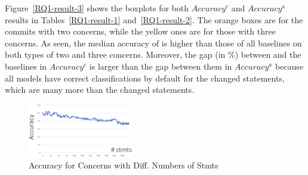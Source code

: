 
Figure~\ref{RQ1-result-3} shows the boxplots for both $Accuracy^c$ and
$Accuracy^a$ results in Tables~\ref{RQ1-result-1}
and~\ref{RQ1-result-2}. The orange boxes are for the commits with two
concerns, while the yellow ones are for those with three concerns. As
seen, the median accuracy of {\tool} is higher than those of all
baselines on both types of two and three concerns. Moreover, the gap
(in \%) between {\tool} and the baselines in $Accuracy^{c}$ is larger
than the gap between them in $Accuracy^{a}$ because all models have
correct classifications by default for the changed statements, which
are many more than the changed statements.


\begin{figure}[t]
	\centering \includegraphics[width=1.8in]{figures/accuracy-concerns-2.png}
	\vspace{-6pt}
	\caption{Accuracy for Concerns with Diff. Numbers of Stmts}
	\label{acc-concerns}
\end{figure}

